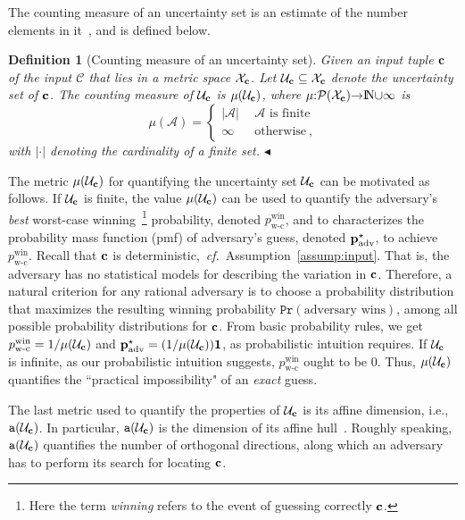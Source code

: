 \documentclass[12pt,draftcls,onecolumn]{IEEEtran}
\newtheorem{defin}{Definition}\newtheorem{assump}{Assumption}
\newcommand{\be}{\begin{equation}}
\newcommand{\ee}{\end{equation}}
\newcommand{\cf}{{\textit{cf.}}}
\newcommand{\N}{\ifmmode {\rm I}\hspace{-.2em}{\rm N} \else \mbox{${\rm I}\hspace{-.2em}{\rm N}$} \fi}
\renewcommand{\vec}[1]{\bf{#1}}     \newcommand{\vecsc}[1]{\mbox {\boldmath \scriptsize $#1$}}     \newcommand{\itvec}[1]{\mbox {\boldmath $#1$}}
\newcommand{\addnew}[1]{{{\color{blue!0!black}#1}}}
\begin{document}
{The counting measure of an uncertainty set is an estimate of the number elements in it~\cite[p.~146]{McDonald-Weiss-2013}, and is defined below.
\begin{defin}[Counting measure of an uncertainty set]\label{def:Cardinality}
Given an input tuple ${\vec c}$ of the input $\mathcal{C}$ that lies in a metric space $\mathcal{X}_{\vec c}$. Let $\mathcal{U}_{\vec c}\subseteq\mathcal{X}_{\vec c}$ denote the uncertainty set of ${\vec c}$. The counting measure of $\mathcal{U}_{\vec c}$ is $\mu(\mathcal{U}_{\vec c})$, where $\mu{:}\mathcal{P}(\mathcal{X}_{\vec c}){\rightarrow} \N {\cup} \infty$ is
\be\label{eq:cardinality}
\mu(\mathcal{A})= \left\{ \begin{array}{ll}
  |\mathcal{A}| & \ \ \textrm{$\mathcal{A}$ is finite}\\
  \infty  & \ \ \mbox{otherwise} \ ,
   \end{array} \right.
\ee
with $|\cdot|$ denoting the cardinality of a \emph{finite} set. \hfill $\blacktriangleleft$
\end{defin}

The metric $\mu(\mathcal{U}_{\vec c})$ for quantifying the uncertainty set $\mathcal{U}_{\vec c}$ can be motivated as follows. If $\mathcal{U}_{\vec c}$ is finite, the value $\mu(\mathcal{U}_{\vec c})$ can be used to quantify the adversary's \emph{best} worst-case winning~\footnote{\addnew{Here the term \emph{winning} refers to the event of  guessing correctly ${\vec c}$.}} probability, denoted $p^{\textrm{win}}_{\textrm{w-c}}$, and to characterizes the probability mass function (pmf) of adversary's guess, denoted ${\vec p}^\star_{\textrm{adv}}$, to achieve $p^{\textrm{win}}_{\textrm{w-c}}$. Recall that ${\vec c}$ is deterministic,~\cf~Assumption~\ref{assump:input}. That is, the adversary has no statistical models for describing the variation in ${\vec c}$. Therefore, a natural criterion for any rational adversary is to choose a probability distribution that maximizes the resulting winning probability $\texttt{Pr}(\textrm{adversary wins})$, among all possible probability distributions for ${\vec c}$. From basic probability rules, we get $p^{\textrm{win}}_{\textrm{w-c}}= 1/\mu(\mathcal{U}_{\vec c})$ and ${\vec p}^\star_{\textrm{adv}}=(1/\mu(\mathcal{U}_{\vec c})){\vec 1}$, as probabilistic intuition requires. If $\mathcal{U}_{\vec c}$ is infinite, as our probabilistic intuition suggests, $p^{\textrm{win}}_{\textrm{w-c}}$ ought to be $0$. Thus, $\mu(\mathcal{U}_{\vec c})$ quantifies the ``practical impossibility" of an \emph{exact} guess.





The last metric used to quantify the properties of $\mathcal{U}_{\vec c}$ is its affine dimension, i.e., $\texttt{a}(\mathcal{U}_{\vec c})$. In particular, $\texttt{a}(\mathcal{U}_{\vec c})$ is the dimension of its affine hull~\cite[\S~2.1.3]{Boyd-Vandenberghe-04}. Roughly speaking, $\texttt{a}(\mathcal{U}_{\vec c})$ quantifies the number of orthogonal directions, along which an adversary has to perform its search for locating ${\vec c}$.
}
\end{document}

